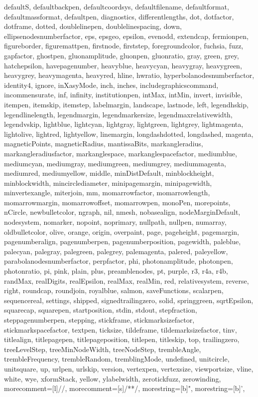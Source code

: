 {{  defaultS, defaultbackpen, defaultcoordsys, defaultfilename, defaultformat,
  defaultmassformat, defaultpen, diagnostics, differentlengths, dot, dotfactor,
  dotframe, dotted, doublelinepen, doublelinespacing, down,
  ellipsenodesnumberfactor, eps, epsgeo, epsilon, evenodd, extendcap,
  fermionpen, figureborder, figuremattpen, firstnode, firststep,
  foregroundcolor, fuchsia, fuzz, gapfactor, ghostpen, gluonamplitude,
  gluonpen, gluonratio, gray, green, grey, hatchepsilon, havepagenumber,
  heavyblue, heavycyan, heavygray, heavygreen, heavygrey, heavymagenta,
  heavyred, hline, hwratio, hyperbolanodesnumberfactor, identity4, ignore,
  inXasyMode, inch, inches, includegraphicscommand, incommensurate, inf,
  infinity, institutionpen, intMax, intMin, invert, invisible, itempen,
  itemskip, itemstep, labelmargin, landscape, lastnode, left, legendhskip,
  legendlinelength, legendmargin, legendmarkersize, legendmaxrelativewidth,
  legendvskip, lightblue, lightcyan, lightgray, lightgreen, lightgrey,
  lightmagenta, lightolive, lightred, lightyellow, linemargin, longdashdotted,
  longdashed, magenta, magneticPoints, magneticRadius, mantissaBits,
  markangleradius, markangleradiusfactor, markanglespace, markanglespacefactor,
  mediumblue, mediumcyan, mediumgray, mediumgreen, mediumgrey, mediummagenta,
  mediumred, mediumyellow, middle, minDistDefault, minblockheight,
  minblockwidth, mincirclediameter, minipagemargin, minipagewidth,
  minvertexangle, miterjoin, mm, momarrowfactor, momarrowlength,
  momarrowmargin, momarrowoffset, momarrowpen, monoPen, morepoints, nCircle,
  newbulletcolor, ngraph, nil, nmesh, nobasealign, nodeMarginDefault,
  nodesystem, nomarker, nopoint, noprimary, nullpath, nullpen, numarray,
  oldbulletcolor, olive, orange, origin, overpaint, page, pageheight,
  pagemargin, pagenumberalign, pagenumberpen, pagenumberposition, pagewidth,
  paleblue, palecyan, palegray, palegreen, palegrey, palemagenta, palered,
  paleyellow, parabolanodesnumberfactor, perpfactor, phi, photonamplitude,
  photonpen, photonratio, pi, pink, plain, plus, preamblenodes, pt, purple, r3,
  r4a, r4b, randMax, realDigits, realEpsilon, realMax, realMin, red,
  relativesystem, reverse, right, roundcap, roundjoin, royalblue, salmon,
  saveFunctions, scalarpen, sequencereal, settings, shipped,
  signedtrailingzero, solid, springgreen, sqrtEpsilon, squarecap, squarepen,
  startposition, stdin, stdout, stepfraction, steppagenumberpen, stepping,
  stickframe, stickmarksizefactor, stickmarkspacefactor, textpen, ticksize,
  tildeframe, tildemarksizefactor, tinv, titlealign, titlepagepen,
  titlepageposition, titlepen, titleskip, top, trailingzero, treeLevelStep,
  treeMinNodeWidth, treeNodeStep, trembleAngle, trembleFrequency,
  trembleRandom, tremblingMode, undefined, unitcircle, unitsquare, up, urlpen,
  urlskip, version, vertexpen, vertexsize, viewportsize, vline, white, wye,
  xformStack, yellow, ylabelwidth, zerotickfuzz, zerowinding},
  morecomment=[l]{//},%
  morecomment=[s]{/*}{*/},%
  morestring=[b]",%
  morestring=[b]',%
}
